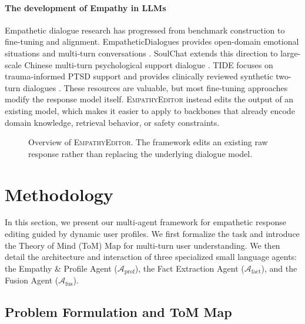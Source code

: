 \documentclass[11pt]{article}
\begin{document}
\paragraph{The development of Empathy in LLMs}
Empathetic dialogue research has progressed from benchmark construction to fine-tuning and alignment. EmpatheticDialogues provides open-domain emotional situations and multi-turn conversations \citep{rashkin2019towards}. SoulChat extends this direction to large-scale Chinese multi-turn psychological support dialogue \citep{chen-etal-2023-soulchat}. TIDE focuses on trauma-informed PTSD support and provides clinically reviewed synthetic two-turn dialogues \citep{bn2025pursuit}. These resources are valuable, but most fine-tuning approaches modify the response model itself. \textsc{EmpathyEditor} instead edits the output of an existing model, which makes it easier to apply to backbones that already encode domain knowledge, retrieval behavior, or safety constraints.

\begin{figure}[t]
  \centering
  \caption{Overview of \textsc{EmpathyEditor}. The framework edits an existing raw response rather than replacing the underlying dialogue model.}
  \label{fig:workflow}
\end{figure}



\section{Methodology}
\label{sec:methodology}

In this section, we present our multi-agent framework for empathetic response editing guided by dynamic user profiles. We first formalize the task and introduce the Theory of Mind (ToM) Map for multi-turn user understanding. We then detail the architecture and interaction of three specialized small language agents: the Empathy \& Profile Agent ($\mathcal{A}_{\text{prof}}$), the Fact Extraction Agent ($\mathcal{A}_{\text{fact}}$), and the Fusion Agent ($\mathcal{A}_{\text{fus}}$).

\subsection{Problem Formulation and ToM Map}
\label{subsec:problem_formulation}
\end{document}
